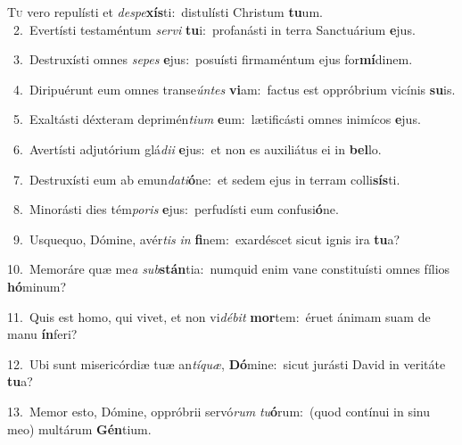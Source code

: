 \lettrine{\initial\textcolor{\initialcolor}{T}}{u} vero repulísti et \textit{de}\-\textit{spe}\textbf{xís}ti:~\star distulísti Christum \textbf{tu}\-um.\\
{\numbfont\textcolor{\numbcolor}{~2.}}~Evertísti testaméntum \textit{ser}\-\textit{vi} \textbf{tu}\-i:~\star profanásti in terra Sanctuárium \textbf{e}\-jus.\par
{\numbfont\textcolor{\numbcolor}{~3.}}~Destruxísti omnes \textit{se}\-\textit{pes} \textbf{e}\-jus:~\star posuísti firmaméntum ejus for\-\textbf{mí}\-dinem.\par
{\numbfont\textcolor{\numbcolor}{~4.}}~Diripuérunt eum omnes transe\-\textit{ún}\-\textit{tes} \textbf{vi}\-am:~\star factus est oppróbrium vicínis \textbf{su}\-is.\par
{\numbfont\textcolor{\numbcolor}{~5.}}~Exaltásti déxteram deprimén\-\textit{ti}\-\textit{um} \textbf{e}\-um:~\star lætificásti omnes inimícos \textbf{e}\-jus.\par
{\numbfont\textcolor{\numbcolor}{~6.}}~Avertísti adjutórium glá\-\textit{di}\-\textit{i} \textbf{e}\-jus:~\star et non es auxiliátus ei in \textbf{bel}\-lo.\par
{\numbfont\textcolor{\numbcolor}{~7.}}~Destruxísti eum ab emun\-\textit{da}\-\textit{ti}\textbf{ó}ne:~\star et sedem ejus in terram colli\-\textbf{sís}\-ti.\par
{\numbfont\textcolor{\numbcolor}{~8.}}~Minorásti dies tém\-\textit{po}\-\textit{ris} \textbf{e}\-jus:~\star perfudísti eum confusi\-\textbf{ó}\-ne.\par
{\numbfont\textcolor{\numbcolor}{~9.}}~Usquequo, Dómine, avér\textit{tis} \textit{in} \textbf{fi}\-nem:~\star exardéscet sicut ignis ira \textbf{tu}\-a?\par
{\numbfont\textcolor{\numbcolor}{10.}}~Memoráre quæ me\textit{a} \textit{sub}\-\textbf{stán}tia:~\star numquid enim vane constituísti omnes fílios \textbf{hó}\-minum?\par
{\numbfont\textcolor{\numbcolor}{11.}}~Quis est homo, qui vivet, et non vi\-\textit{dé}\-\textit{bit} \textbf{mor}\-tem:~\star éruet ánimam suam de manu \textbf{ín}\-feri?\par
{\numbfont\textcolor{\numbcolor}{12.}}~Ubi sunt misericórdiæ tuæ an\-\textit{tí}\-\textit{quæ}, \textbf{Dó}\-mine:~\star sicut jurásti David in veritáte \textbf{tu}\-a?\par
{\numbfont\textcolor{\numbcolor}{13.}}~Memor esto, Dómine, oppróbrii servó\textit{rum} \textit{tu}\-\textbf{ó}rum:~\star (quod contínui in sinu meo) multárum \textbf{Gén}\-tium.\par
